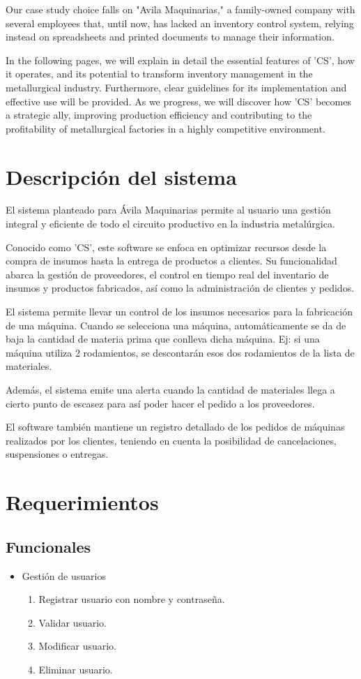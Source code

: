 \documentclass{article}
\begin{document}
	Our case study choice falls on "Avila Maquinarias," a family-owned company with several employees that, until now, has lacked an inventory control system, relying instead on spreadsheets and printed documents to manage their information.

	In the following pages, we will explain in detail the essential features of 'CS', how it operates, and its potential to transform inventory management in the metallurgical industry. Furthermore, clear guidelines for its implementation and effective use will be provided. As we progress, we will discover how 'CS' becomes a strategic ally, improving production efficiency and contributing to the profitability of metallurgical factories in a highly competitive environment.

\section{Descripción del sistema}
	El sistema planteado para Ávila Maquinarias permite al usuario una gestión integral y eficiente de todo el circuito productivo en la industria metalúrgica.
	
	Conocido como 'CS', este software se enfoca en optimizar recursos desde la compra de insumos hasta la entrega de productos a clientes. Su funcionalidad abarca la gestión de proveedores, el control en tiempo real del inventario de insumos y productos fabricados, así como la administración de clientes y pedidos. 

	El sistema permite llevar un control de los insumos necesarios para la fabricación de una máquina. Cuando se selecciona una máquina, automáticamente se da de baja la cantidad de materia prima que conlleva dicha máquina. Ej: si una máquina utiliza 2 rodamientos, se descontarán esos dos rodamientos de la lista de materiales.

	Además, el sistema emite una alerta cuando la cantidad de materiales llega a cierto punto de escasez para así poder hacer el pedido a los proveedores.
	
	El software también mantiene un registro detallado de los pedidos de máquinas realizados por los clientes, teniendo en cuenta la posibilidad de cancelaciones, suspensiones o entregas.

\section{Requerimientos}
\subsection{Funcionales}
\begin{itemize}
	\item Gestión de usuarios
	\begin{enumerate}
		\item Registrar usuario con nombre y contraseña.
		\item Validar usuario.
		\item Modificar usuario.
		\item Eliminar usuario.
	\end{enumerate}
\end{itemize}
\end{document}
